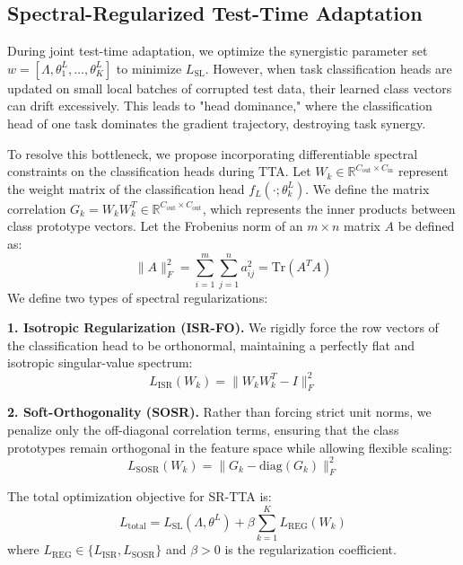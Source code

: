 \documentclass{article}
\theoremstyle{plain}
\theoremstyle{definition}
\theoremstyle{remark}
\begin{document}
\subsection{Spectral-Regularized Test-Time Adaptation}
\label{subsec:sr_tta}
During joint test-time adaptation, we optimize the synergistic parameter set $w = [\Lambda, \theta^L_1, \dots, \theta^L_K]$ to minimize $L_{\text{SL}}$. However, when task classification heads are updated on small local batches of corrupted test data, their learned class vectors can drift excessively. This leads to "head dominance," where the classification head of one task dominates the gradient trajectory, destroying task synergy.

To resolve this bottleneck, we propose incorporating differentiable spectral constraints on the classification heads during TTA. Let $W_k \in \mathbb{R}^{C_{\text{out}} \times C_{\text{in}}}$ represent the weight matrix of the classification head $f_L(\cdot; \theta^L_k)$. We define the matrix correlation $G_k = W_k W_k^T \in \mathbb{R}^{C_{\text{out}} \times C_{\text{out}}}$, which represents the inner products between class prototype vectors. Let the Frobenius norm of an $m \times n$ matrix $A$ be defined as:
\begin{equation}
  \|A\|_F^2 = \sum_{i=1}^m \sum_{j=1}^n a_{ij}^2 = \text{Tr}(A^T A)
\end{equation}
We define two types of spectral regularizations:

\textbf{1. Isotropic Regularization (ISR-FO).} We rigidly force the row vectors of the classification head to be orthonormal, maintaining a perfectly flat and isotropic singular-value spectrum:
\begin{equation}
  L_{\text{ISR}}(W_k) = \|W_k W_k^T - I\|_F^2
\end{equation}

\textbf{2. Soft-Orthogonality (SOSR).} Rather than forcing strict unit norms, we penalize only the off-diagonal correlation terms, ensuring that the class prototypes remain orthogonal in the feature space while allowing flexible scaling:
\begin{equation}
  L_{\text{SOSR}}(W_k) = \|G_k - \text{diag}(G_k)\|_F^2
\end{equation}

The total optimization objective for SR-TTA is:
\begin{equation}
  L_{\text{total}} = L_{\text{SL}}(\Lambda, \theta^L) + \beta \sum_{k=1}^K L_{\text{REG}}(W_k)
\end{equation}
where $L_{\text{REG}} \in \{L_{\text{ISR}}, L_{\text{SOSR}}\}$ and $\beta > 0$ is the regularization coefficient.
\end{document}
